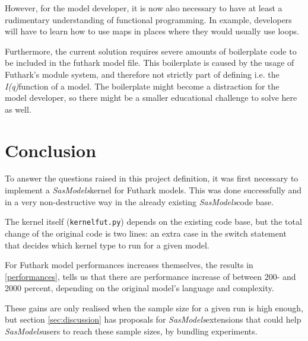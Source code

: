 \documentclass[11pt]{article}
\newcommand{\sasmodels}{\textit{SasModels}}
\newcommand{\iq}{\textit{I(q)}}
\begin{document}
However, for the model developer, it is now also necessary to have at least a
rudimentary understanding of functional programming.
In example, developers will have to learn how to use maps in
places where they would usually use loops.

Furthermore, the current solution requires severe amounts of boilerplate code to
be included in the futhark model file.
This boilerplate is caused by the usage of Futhark's module system, and
therefore not strictly part of defining i.e. the \iq function of a model.
The boilerplate might become a distraction for the model developer, so
there might be a smaller educational challenge to solve here as well.

\section{Conclusion}
To answer the questions raised in this project definition, it was first
necessary to implement a \sasmodels kernel for Futhark models. This was done
successfully and in a very non-destructive way in the already existing
\sasmodels code base.

The kernel itself (\texttt{kernelfut.py}) depends on the existing code base, but
the total change of the original code is two lines: an extra case in the
switch statement that decides which kernel type to run for a given model.

For Futhark model performances increases themselves, the results in
\ref{performances}, tells us that there are performance increase of between
200- and 2000 percent, depending on the original model's language and
complexity.

These gains are only realised when the sample size for a given run is high
enough, but section \ref{sec:discussion} has proposals for \sasmodels extensions
that could help \sasmodels users to reach these sample sizes, by bundling
experiments.
\end{document}

